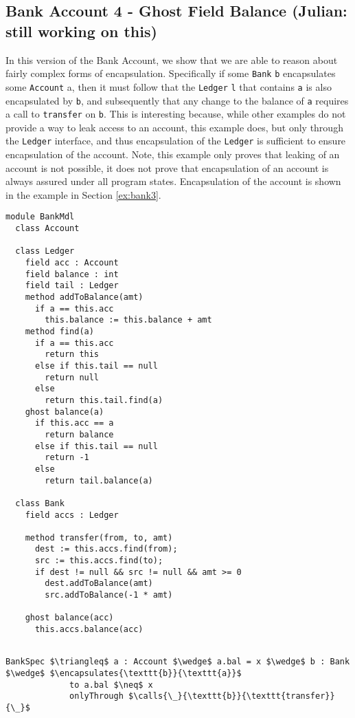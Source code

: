 \subsection{Bank Account 4 - Ghost Field Balance {\color{red}(Julian: still working on this)}} 
\label{ex:bank4}
In this version of the Bank Account, we show that we 
are able to reason about fairly complex forms of encapsulation.
Specifically if some \texttt{Bank} \texttt{b} encapsulates
some \texttt{Account} a, then it must follow that 
the \texttt{Ledger} \texttt{l} that contains \texttt{a}
is also encapsulated by \texttt{b}, and subsequently that any change to
the balance of \texttt{a} requires a call to \texttt{transfer}
on \texttt{b}. This is interesting because, while other examples
do not provide a way to leak access to an account, this example 
does, but only through the \texttt{Ledger} interface, and thus
encapsulation of the \texttt{Ledger} is sufficient to ensure
encapsulation of the account. Note, this example only proves 
that leaking of an account is not possible, it does not prove 
that encapsulation of an account is always assured under all 
program states. Encapsulation of the account is shown in the
example in Section \ref{ex:bank3}.
\begin{lstlisting}[mathescape=true, frame=lines]
module BankMdl
  class Account

  class Ledger
    field acc : Account
    field balance : int
    field tail : Ledger
    method addToBalance(amt)
      if a == this.acc
        this.balance := this.balance + amt
    method find(a)
      if a == this.acc
        return this
      else if this.tail == null
        return null
      else
        return this.tail.find(a)
    ghost balance(a)
      if this.acc == a
        return balance
      else if this.tail == null
        return -1
      else 
        return tail.balance(a)

  class Bank
    field accs : Ledger
    
    method transfer(from, to, amt)
      dest := this.accs.find(from);
      src := this.accs.find(to);
      if dest != null && src != null && amt >= 0
        dest.addToBalance(amt)
        src.addToBalance(-1 * amt)
        
    ghost balance(acc) 
      this.accs.balance(acc)
      
\end{lstlisting}
\begin{lstlisting}[language = Chainmail, mathescape=true, frame=lines]
BankSpec $\triangleq$ a : Account $\wedge$ a.bal = x $\wedge$ b : Bank $\wedge$ $\encapsulates{\texttt{b}}{\texttt{a}}$
             to a.bal $\neq$ x
             onlyThrough $\calls{\_}{\texttt{b}}{\texttt{transfer}}{\_}$
\end{lstlisting}
